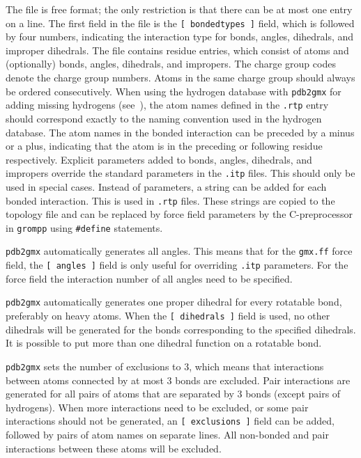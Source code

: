 The file is free format; the only restriction is that there can be at
most one entry on a line.  The first field in the file is the
{\tt [~bondedtypes~]} field, which is followed by four numbers,
indicating the interaction type for bonds, angles, dihedrals, and
improper dihedrals.  The file contains residue entries, which consist
of atoms and (optionally) bonds, angles, dihedrals, and impropers.  The
charge group codes denote the charge group numbers. Atoms in the same
charge group should always be ordered consecutively. When using the
hydrogen database with {\tt pdb2gmx} for adding missing hydrogens
(see~), the atom names defined in the {\tt .rtp} entry
should correspond exactly to the naming convention used in the
hydrogen database. The atom names in the bonded interaction can be
preceded by a minus or a plus, indicating that the atom is in the
preceding or following residue respectively.  Explicit parameters added
to bonds, angles, dihedrals, and impropers override
the standard parameters in the {\tt .itp} files.  This should only be
used in special cases. Instead of parameters, a string can be added
for each bonded interaction.  This is used in  {\tt .rtp}
files. These strings are copied to the topology file and can be
replaced by force field parameters by the C-preprocessor in {\tt grompp}
using {\tt \#define} statements.

{\tt pdb2gmx} automatically generates all angles. This means that for the
{\tt gmx.ff} force field,
the {\tt [~angles~]} field is only useful for overriding {\tt .itp}
parameters. For the  force field the interaction number
of all angles need to be specified.

{\tt pdb2gmx} automatically generates one proper dihedral for every rotatable
bond, preferably on heavy atoms. When the {\tt [~dihedrals~]} field is used,
no other dihedrals will be generated for the bonds corresponding to the
specified  dihedrals. It is possible to put more than one dihedral
function on a rotatable bond. 

{\tt pdb2gmx} sets the number of exclusions to 3, which
means that interactions between atoms connected by at most 3 bonds are
excluded. Pair interactions are generated for all pairs of atoms that are
separated by 3 bonds (except pairs of hydrogens).
When more interactions need to be excluded, or some pair interactions should
not be generated, an {\tt [~exclusions~]} field can be added, followed by
pairs of atom names on separate lines. All non-bonded and pair interactions
between these atoms will be excluded.

